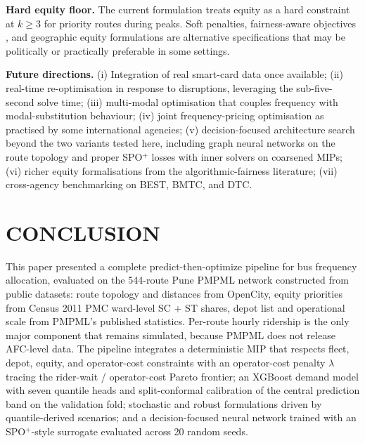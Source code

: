 \documentclass[a4paper,twoside]{article}
\begin{document}
\textbf{Hard equity floor.} The current formulation treats
equity as a hard constraint at $k \geq 3$ for priority routes
during peaks. Soft penalties, fairness-aware objectives
\cite{wilder2019melding}, and geographic equity formulations
are alternative specifications that may be politically or
practically preferable in some settings.

\textbf{Future directions.} (i) Integration of real smart-card
data once available; (ii) real-time re-optimisation in response
to disruptions, leveraging the sub-five-second solve time;
(iii) multi-modal optimisation that couples frequency with
modal-substitution behaviour; (iv) joint frequency-pricing
optimisation as practised by some international agencies;
(v) decision-focused architecture search beyond the two
variants tested here, including graph neural networks on the
route topology and proper SPO$^+$ losses with inner solvers on
coarsened MIPs; (vi) richer equity formalisations from the
algorithmic-fairness literature; (vii) cross-agency benchmarking
on BEST, BMTC, and DTC.

\section{\uppercase{Conclusion}}
\label{sec:conclusion}

This paper presented a complete predict-then-optimize pipeline
for bus frequency allocation, evaluated on the 544-route Pune
PMPML network constructed from public datasets: route topology
and distances from OpenCity, equity priorities from Census 2011
PMC ward-level SC + ST shares, depot list and operational scale
from PMPML's published statistics. Per-route hourly ridership is
the only major component that remains simulated, because PMPML
does not release AFC-level data. The pipeline integrates a
deterministic MIP that respects fleet, depot, equity, and
operator-cost constraints with an operator-cost penalty $\lambda$
tracing the rider-wait / operator-cost Pareto frontier; an
XGBoost demand model with seven quantile heads and split-conformal
calibration of the central prediction band on the validation fold;
stochastic and robust formulations driven by quantile-derived
scenarios; and a decision-focused neural network trained with an
SPO$^+$-style surrogate evaluated across 20 random seeds.
\end{document}
